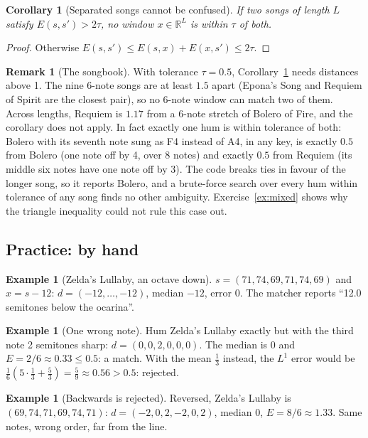 \documentclass[11pt]{article}
\newtheorem{corollary}[theorem]{Corollary}
\theoremstyle{definition}
\newtheorem{example}[theorem]{Example}
\newtheorem{remark}[theorem]{Remark}
\newcommand{\R}{\mathbb{R}}
\begin{document}
\begin{corollary}[Separated songs cannot be confused]\label{cor:sep}
If two songs of length $L$ satisfy $E(s,s')>2\tau$, no window $x\in\R^L$ is within
$\tau$ of both.
\end{corollary}
\begin{proof}
Otherwise $E(s,s')\le E(s,x)+E(x,s')\le2\tau$.
\end{proof}

\begin{remark}[The songbook]
With tolerance $\tau=0.5$, Corollary~\ref{cor:sep} needs distances above 1. The nine
6-note songs are at least $1.5$ apart (Epona's Song and Requiem of Spirit are the
closest pair), so no 6-note window can match two of them. Across lengths, Requiem is
$1.17$ from a 6-note stretch of Bolero of Fire, and the corollary does not apply. In
fact exactly one hum is within tolerance of both: Bolero with its seventh note sung as
F4 instead of A4, in any key, is exactly $0.5$ from Bolero (one note off by 4, over 8
notes) and exactly $0.5$ from Requiem (its middle six notes have one note off by 3).
The code breaks ties in favour of the longer song, so it reports Bolero, and a
brute-force search over every hum within tolerance of any song finds no other
ambiguity. Exercise~\ref{ex:mixed} shows why the triangle inequality could not rule
this case out.
\end{remark}

\subsection{Practice: by hand}

\begin{example}[Zelda's Lullaby, an octave down]
$s=(71,74,69,71,74,69)$ and $x=s-12$: $d=(-12,\dots,-12)$, median $-12$, error 0. The
matcher reports ``12.0 semitones below the ocarina''.
\end{example}

\begin{example}[One wrong note]\label{ex:wrong}
Hum Zelda's Lullaby exactly but with the third note 2 semitones sharp:
$d=(0,0,2,0,0,0)$. The median is 0 and $E=2/6\approx0.33\le0.5$: a match. With the
mean $\frac13$ instead, the $L^1$ error would be
$\frac16(5\cdot\frac13+\frac53)=\frac59\approx0.56>0.5$: rejected.
\end{example}

\begin{example}[Backwards is rejected]
Reversed, Zelda's Lullaby is $(69,74,71,69,74,71)$: $d=(-2,0,2,-2,0,2)$, median 0,
$E=8/6\approx1.33$. Same notes, wrong order, far from the line.
\end{example}
\end{document}
